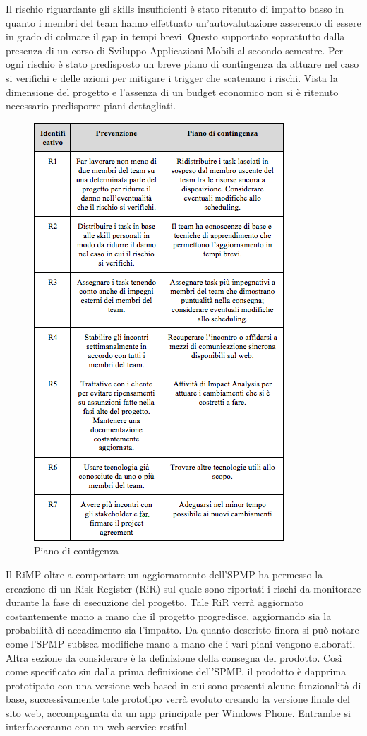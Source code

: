 Il rischio riguardante gli skills insufficienti è stato ritenuto di impatto basso in quanto i membri del team hanno effettuato un’autovalutazione asserendo di essere in grado di colmare il gap in tempi brevi. Questo supportato soprattutto dalla presenza di un corso di Sviluppo Applicazioni Mobili al secondo semestre.
Per ogni rischio è stato predisposto un breve piano di contingenza da attuare nel caso si verifichi e delle azioni per mitigare i trigger che scatenano i rischi. Vista la dimensione del progetto e l’assenza di un budget economico non si è ritenuto necessario predisporre piani dettagliati.
\begin{figure}[h]
\centering
\includegraphics[scale=.6]{img/18.png}
\caption{Piano di contigenza}
\label{fig:cd}
\end{figure}
Il RiMP oltre a comportare un aggiornamento dell’SPMP ha permesso la creazione di un Risk Register (RiR) sul quale sono riportati i rischi da monitorare durante la fase di esecuzione del progetto.
Tale RiR verrà aggiornato costantemente mano a mano che il progetto progredisce, aggiornando sia la probabilità di accadimento sia l’impatto.
Da quanto descritto finora si può notare come l’SPMP subisca modifiche mano a mano che i vari piani vengono elaborati. Altra sezione da considerare è la definizione della consegna del prodotto. Così come specificato sin dalla prima definizione dell’SPMP, il prodotto è dapprima prototipato con una versione web-based in cui sono presenti alcune funzionalità di base, successivamente tale prototipo verrà evoluto creando la versione finale del sito web, accompagnata da un app principale per Windows Phone. Entrambe si interfacceranno con un web service restful.

